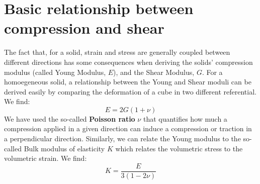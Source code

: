 \documentclass[a4paper, 11pt, normalem]{report}
\begin{document}
\section{Basic relationship between compression and shear}
The fact that, for a solid, strain and stress are generally coupled between different directions has some consequences when deriving the solids' compression modulus (called Young Modulus, $E$), and the Shear Modulus, $G$.
For a homoegeneous solid, a relationship between the Young and Shear moduli can be derived easily by comparing the deformation of a cube in two different referential.
We find:
\begin{equation}
    E = 2G(1+\nu)
\end{equation}
We have used the so-called \textbf{Poisson ratio} $\nu$ that quantifies how much a compression applied in a given direction can induce a compression or traction in a perpendicular direction.
Similarly, we can relate the Young modulus to the so-called Bulk modulus of elasticity $K$ which relates the volumetric stress to the volumetric strain.
We find:
\begin{equation}
    K = \frac{E}{3(1-2\nu)}
\end{equation}
\end{document}
